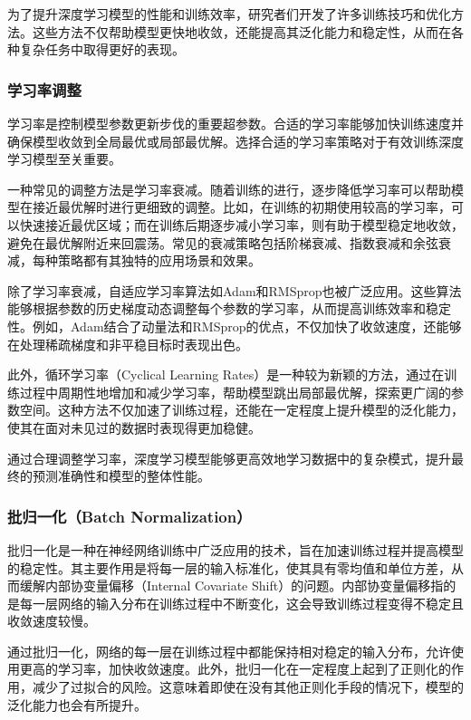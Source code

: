 为了提升深度学习模型的性能和训练效率，研究者们开发了许多训练技巧和优化方法。这些方法不仅帮助模型更快地收敛，还能提高其泛化能力和稳定性，从而在各种复杂任务中取得更好的表现。

\subsubsection{学习率调整}

学习率是控制模型参数更新步伐的重要超参数。合适的学习率能够加快训练速度并确保模型收敛到全局最优或局部最优解。选择合适的学习率策略对于有效训练深度学习模型至关重要。

一种常见的调整方法是学习率衰减。随着训练的进行，逐步降低学习率可以帮助模型在接近最优解时进行更细致的调整。比如，在训练的初期使用较高的学习率，可以快速接近最优区域；而在训练后期逐步减小学习率，则有助于模型稳定地收敛，避免在最优解附近来回震荡。常见的衰减策略包括阶梯衰减、指数衰减和余弦衰减，每种策略都有其独特的应用场景和效果。

除了学习率衰减，自适应学习率算法如Adam和RMSprop也被广泛应用。这些算法能够根据参数的历史梯度动态调整每个参数的学习率，从而提高训练效率和稳定性。例如，Adam结合了动量法和RMSprop的优点，不仅加快了收敛速度，还能够在处理稀疏梯度和非平稳目标时表现出色。

此外，循环学习率（Cyclical Learning Rates）是一种较为新颖的方法，通过在训练过程中周期性地增加和减少学习率，帮助模型跳出局部最优解，探索更广阔的参数空间。这种方法不仅加速了训练过程，还能在一定程度上提升模型的泛化能力，使其在面对未见过的数据时表现得更加稳健。

通过合理调整学习率，深度学习模型能够更高效地学习数据中的复杂模式，提升最终的预测准确性和模型的整体性能。

\subsubsection{批归一化（Batch Normalization）}

批归一化是一种在神经网络训练中广泛应用的技术，旨在加速训练过程并提高模型的稳定性。其主要作用是将每一层的输入标准化，使其具有零均值和单位方差，从而缓解内部协变量偏移（Internal Covariate Shift）的问题。内部协变量偏移指的是每一层网络的输入分布在训练过程中不断变化，这会导致训练过程变得不稳定且收敛速度较慢。

通过批归一化，网络的每一层在训练过程中都能保持相对稳定的输入分布，允许使用更高的学习率，加快收敛速度。此外，批归一化在一定程度上起到了正则化的作用，减少了过拟合的风险。这意味着即使在没有其他正则化手段的情况下，模型的泛化能力也会有所提升。

